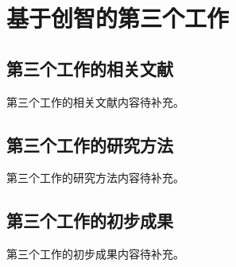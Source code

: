 \chapter{基于创智的第三个工作}
\label{chap:work3}

\section{第三个工作的相关文献}

第三个工作的相关文献内容待补充。

\section{第三个工作的研究方法}

第三个工作的研究方法内容待补充。

\section{第三个工作的初步成果}

第三个工作的初步成果内容待补充。